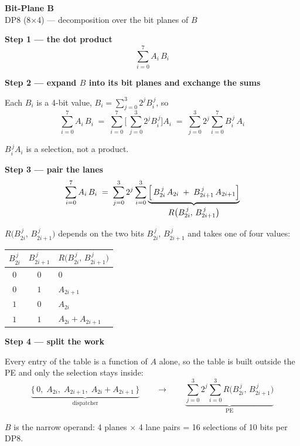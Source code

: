 \documentclass[fleqn]{article}
\newcommand{\Rf}{R\bigl(B_{2i}^{\,j},\, B_{2i+1}^{\,j}\bigr)}
\begin{document}
\begin{center}
{\LARGE \textbf{Bit-Plane B}}\\[4pt]
{\large DP8 (8$\times$4) --- decomposition over the bit planes of $B$}
\end{center}

\vspace{1.5em}

\noindent\textbf{Step 1 --- the dot product}
\[
\sum_{i=0}^{7} A_i \, B_i
\]

\vspace{0.5em}

\noindent\textbf{Step 2 --- expand $B$ into its bit planes and exchange the sums}

\noindent Each $B_i$ is a 4-bit value, $B_i = \sum_{j=0}^{3} 2^{j} B_i^{\,j}$, so
\[
\sum_{i=0}^{7} A_i \, B_i
  \;=\; \sum_{i=0}^{7} \Biggl[\, \sum_{j=0}^{3} 2^{j} B_i^{\,j} \Biggr] A_i
  \;=\; \sum_{j=0}^{3} 2^{j} \sum_{i=0}^{7} B_i^{\,j} \, A_i
\]

\noindent $B_i^{\,j} A_i$ is a selection, not a product.

\vspace{0.5em}

\noindent\textbf{Step 3 --- pair the lanes}
\[
\sum_{i=0}^{7} A_i \, B_i
  \;=\; \sum_{j=0}^{3} 2^{j} \sum_{i=0}^{3}
        \underbrace{\Bigl[\, B_{2i}^{\,j} \, A_{2i} \;+\; B_{2i+1}^{\,j} \, A_{2i+1} \Bigr]}_{\textstyle \Rf}
\]

\noindent $\Rf$ depends on the two bits $B_{2i}^{\,j}$, $B_{2i+1}^{\,j}$ and takes one of
four values:

\vspace{1em}

\begin{center}
\renewcommand{\arraystretch}{1.35}
\begin{tabular}{c c | l}
$B_{2i}^{\,j}$ & $B_{2i+1}^{\,j}$ & \multicolumn{1}{c}{$\Rf$} \\
\hline
$0$ & $0$ & $0$ \\
$0$ & $1$ & $A_{2i+1}$ \\
$1$ & $0$ & $A_{2i}$ \\
$1$ & $1$ & $A_{2i} + A_{2i+1}$ \\
\end{tabular}
\end{center}

\vspace{1.5em}

\noindent\textbf{Step 4 --- split the work}

\noindent Every entry of the table is a function of $A$ alone, so the table is built
outside the PE and only the selection stays inside:
\[
\underbrace{\bigl\{\, 0,\; A_{2i},\; A_{2i+1},\; A_{2i} + A_{2i+1} \,\bigr\}}_{\textstyle \text{dispatcher}}
\qquad\longrightarrow\qquad
\underbrace{\sum_{j=0}^{3} 2^{j} \sum_{i=0}^{3} \Rf}_{\textstyle \text{PE}}
\]

\vspace{1.5em}

\noindent $B$ is the narrow operand: 4 planes $\times$ 4 lane pairs = 16 selections of
10 bits per DP8.
\end{document}
